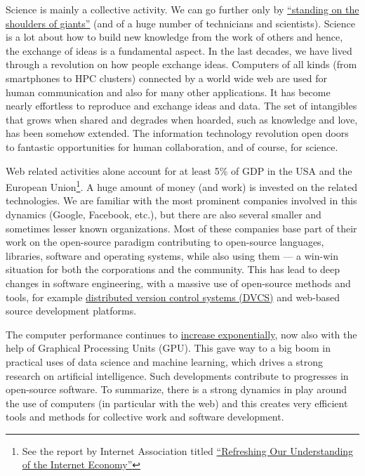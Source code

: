 Science is mainly a collective activity.  We can go further only by
\href{https://en.wikipedia.org/wiki/Standing\_on\_the\_shoulders\_of\_giants}{``standing
on the shoulders of giants''}
(and of a huge number of technicians and scientists).  Science is a lot about
how to build new knowledge from the work of others and hence, the exchange
of ideas is a fundamental aspect.
%
In the last decades, we have lived through a revolution on how people exchange
ideas.
%
Computers of all kinds (from smartphones to HPC clusters) connected by a world
wide web are used for human communication and also for many other applications.
%
It has become nearly effortless to reproduce and exchange ideas and data.
%
The set of intangibles that grows when shared and degrades when hoarded, such as
knowledge and love, has been somehow extended.
%
The information technology revolution open doors to fantastic opportunities for
human collaboration, and of course, for science.

Web related activities alone account for at least 5\% of GDP in the USA and the
European Union\footnote{See the report by Internet Association titled
\href{https://internetassociation.org/reports/refreshing-understanding-internet-economy-ia-report/}
{``Refreshing Our Understanding of the Internet Economy''}}.
A huge amount of money (and work) is invested on the related technologies. We
are familiar with the most prominent companies involved in this dynamics
(Google, Facebook, etc.), but there are also several smaller and sometimes
lesser known organizations.  Most of these companies base part of their work on
the open-source paradigm contributing to open-source languages, libraries,
software and operating systems, while also using them --- a win-win situation
for both the corporations and the community.
%
This has lead to deep changes in software engineering, with a massive use of
open-source methods and tools, for example
\href{https://en.wikipedia.org/wiki/Distributed_version_control}{distributed
version control systems (DVCS)} and web-based source development platforms.

The computer performance continues to
\href{https://en.wikipedia.org/wiki/Moore\%27s_law}{increase exponentially},
now also with the help of Graphical Processing Units (GPU). This gave way to a
big boom in practical uses of data science and machine learning, which drives a
strong research on artificial intelligence. Such developments contribute to
progresses in open-source software.
%
To summarize, there is a strong dynamics in play around the use of computers (in
particular with the web) and this creates very efficient tools and methods
for collective work and software development.

